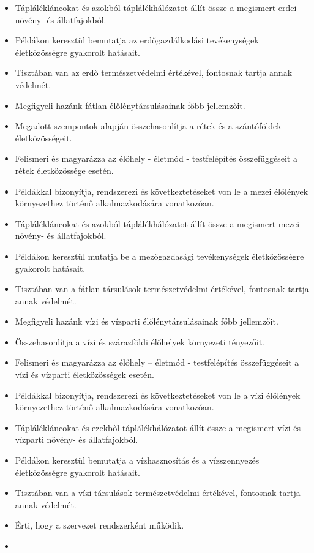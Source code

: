 \begin{itemize}
\item
  Táplálékláncokat és azokból táplálékhálózatot állít össze a megismert
  erdei növény- és állatfajokból.
\item
  Példákon keresztül bemutatja az erdőgazdálkodási tevékenységek
  életközösségre gyakorolt hatásait.
\item
  Tisztában van az erdő természetvédelmi értékével, fontosnak tartja
  annak védelmét.
\item
  Megfigyeli hazánk fátlan élőlénytársulásainak főbb jellemzőit.
\item
  Megadott szempontok alapján összehasonlítja a rétek és a szántóföldek
  életközösségeit.
\item
  Felismeri és magyarázza az élőhely - életmód - testfelépítés
  összefüggéseit a rétek életközössége esetén.
\item
  Példákkal bizonyítja, rendszerezi és következtetéseket von le a mezei
  élőlények környezethez történő alkalmazkodására vonatkozóan.
\item
  Táplálékláncokat és azokból táplálékhálózatot állít össze a megismert
  mezei növény- és állatfajokból.
\item
  Példákon keresztül mutatja be a mezőgazdasági tevékenységek
  életközösségre gyakorolt hatásait.
\item
  Tisztában van a fátlan társulások természetvédelmi értékével,
  fontosnak tartja annak védelmét.
\item
  Megfigyeli hazánk vízi és vízparti élőlénytársulásainak főbb
  jellemzőit.
\item
  Összehasonlítja a vízi és szárazföldi élőhelyek környezeti tényezőit.
\item
  Felismeri és magyarázza az élőhely -- életmód - testfelépítés
  összefüggéseit a vízi és vízparti életközösségek esetén.
\item
  Példákkal bizonyítja, rendszerezi és következtetéseket von le a vízi
  élőlények környezethez történő alkalmazkodására vonatkozóan.
\item
  Táplálékláncokat és ezekből táplálékhálózatot állít össze a megismert
  vízi és vízparti növény- és állatfajokból.
\item
  Példákon keresztül bemutatja a vízhasznosítás és a vízszennyezés
  életközösségre gyakorolt hatásait.
\item
  Tisztában van a vízi társulások természetvédelmi értékével, fontosnak
  tartja annak védelmét.
\item
  Érti, hogy a szervezet rendszerként működik.
\item

\end{itemize}
